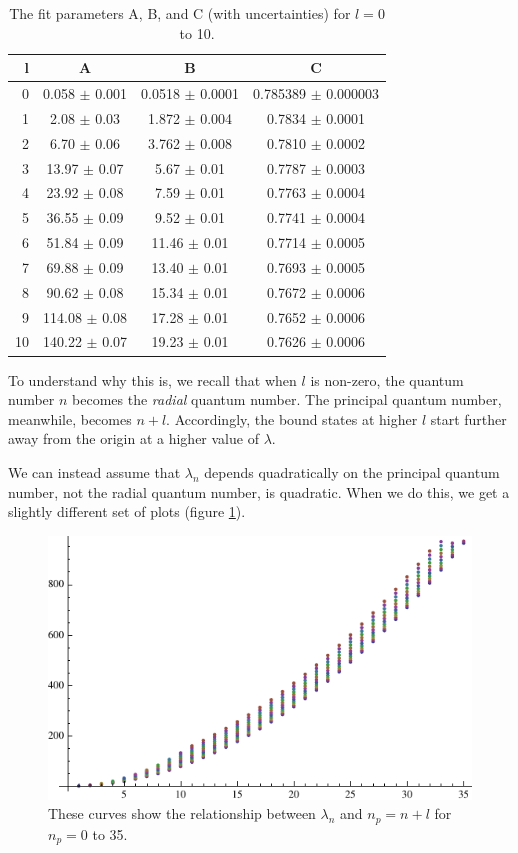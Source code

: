 \documentclass[12pt,twoside]{reedthesis}
\begin{document}
\begin{table}[h]
	\centering
	\caption{The fit parameters A, B, and C (with uncertainties) for $l = 0$ to 10.}
	\label{tab:fitparams}
	\begin{tabular}{r|ccc}
		l	& A	 	& B	 	& C	 \\
		\hline
		0	& 0.058	$\pm$ 0.001	& 0.0518	$\pm$ 0.0001	& 0.785389	$\pm$ 0.000003\\
		1	& 2.08	$\pm$ 0.03	& 1.872	$\pm$ 0.004	& 0.7834	$\pm$ 0.0001\\
		2	& 6.70	$\pm$ 0.06	& 3.762	$\pm$ 0.008	& 0.7810	$\pm$ 0.0002\\
		3	& 13.97	$\pm$ 0.07	& 5.67	$\pm$ 0.01	& 0.7787	$\pm$ 0.0003\\
		4	& 23.92	$\pm$ 0.08	& 7.59	$\pm$ 0.01	& 0.7763	$\pm$ 0.0004\\
		5	& 36.55	$\pm$ 0.09	& 9.52	$\pm$ 0.01	& 0.7741	$\pm$ 0.0004\\
		6	& 51.84	$\pm$ 0.09	& 11.46	$\pm$ 0.01	& 0.7714	$\pm$ 0.0005\\
		7	& 69.88	$\pm$ 0.09	& 13.40	$\pm$ 0.01	& 0.7693	$\pm$ 0.0005\\
		8	& 90.62	$\pm$ 0.08	& 15.34	$\pm$ 0.01	& 0.7672	$\pm$ 0.0006\\
		9	& 114.08	$\pm$ 0.08	& 17.28	$\pm$ 0.01	& 0.7652	$\pm$ 0.0006\\
		10	& 140.22	$\pm$ 0.07	& 19.23	$\pm$ 0.01	& 0.7626	$\pm$ 0.0006
	\end{tabular}
\end{table}

To understand why this is, we recall that when $l$ is non-zero, the quantum number $n$ becomes the \emph{radial} quantum number. The principal quantum number, meanwhile, becomes $n + l$. Accordingly, the bound states at higher $l$ start further away from the origin at a higher value of $\lambda$. 

We can instead assume that $\lambda_n$ depends quadratically on the principal quantum number, not the radial quantum number, is quadratic. When we do this, we get a slightly different set of plots (figure \ref{fig:alllcs-principal}).

\begin{figure}[h]
\centering
\includegraphics{Figures/alllcs-principal}
\caption[Plots of $\lambda_n$ versus $n + l$ for $l = 0$ to $10$]{These curves show the relationship between $\lambda_n$ and $n_p = n + l$ for $n_p = 0$ to 35.}
\label{fig:alllcs-principal}
\end{figure}
\end{document}
